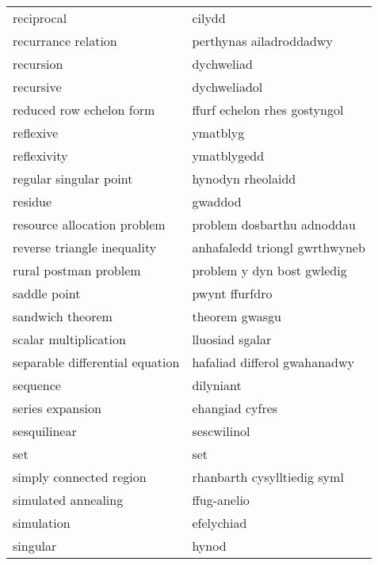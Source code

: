 \begin{supertabular}{p{0.22\textwidth}p{0.22\textwidth}}
                      reciprocal &                          cilydd \\
             recurrance relation &         perthynas ailadroddadwy \\
                       recursion &                      dychweliad \\
                       recursive &                    dychweliadol \\
        reduced row echelon form &    ffurf echelon rhes gostyngol \\
                       reflexive &                        ymatblyg \\
                     reflexivity &                     ymatblygedd \\
          regular singular point &               hynodyn rheolaidd \\
                         residue &                         gwaddod \\
     resource allocation problem &      problem dosbarthu adnoddau \\
     reverse triangle inequality &   anhafaledd triongl gwrthwyneb \\
           rural postman problem &      problem y dyn bost gwledig \\
                    saddle point &                  pwynt ffurfdro \\
                sandwich theorem &                  theorem gwasgu \\
           scalar multiplication &                 lluosiad sgalar \\
 separable differential equation &    hafaliad differol gwahanadwy \\
                        sequence &                       dilyniant \\
                series expansion &                 ehangiad cyfres \\
                    sesquilinear &                     sescwilinol \\
                             set &                             set \\
         simply connected region &     rhanbarth cysylltiedig syml \\
             simulated annealing &                     ffug-anelio \\
                      simulation &                      efelychiad \\
                        singular &                           hynod \\

\end{supertabular}
